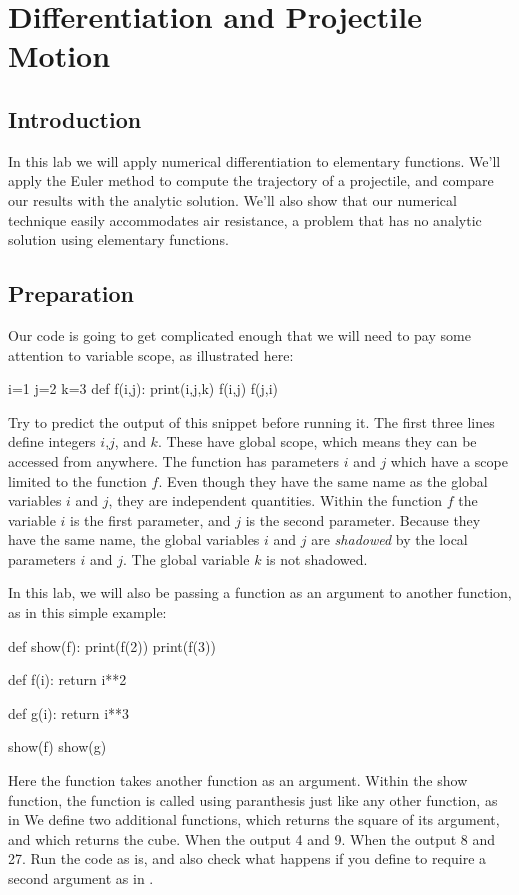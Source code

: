 \chapter{Differentiation and Projectile Motion}

\section{Introduction}

In this lab we will apply numerical differentiation to elementary
functions.  We'll apply the Euler method to compute the trajectory of
a projectile, and compare our results with the analytic solution.
We'll also show that our numerical technique easily accommodates air
resistance, a problem that has no analytic solution using elementary
functions.

\section{Preparation}

Our code is going to get complicated enough that we will need to pay
some attention to variable scope, as illustrated here:
\begin{python}
i=1
j=2
k=3
def f(i,j):
    print(i,j,k)
f(i,j)
f(j,i)
\end{python}
Try to predict the output of this snippet before running it.  The
first three lines define integers $i$,$j$, and $k$. These have global
scope, which means they can be accessed from anywhere.  The function
 has parameters $i$ and $j$ which have a scope limited to
the function $f$.  Even though they have the same name as the global
variables $i$ and $j$, they are independent quantities.  Within the
function $f$ the variable $i$ is the first parameter, and $j$ is the
second parameter.  Because they have the same name, the global
variables $i$ and $j$ are {\em shadowed} by the local parameters $i$
and $j$.  The global variable $k$ is not shadowed.

In this lab, we will also be passing a function as an argument to another
function, as in this simple example:
\begin{python}
def show(f):
    print(f(2))
    print(f(3))    
    
def f(i):
    return i**2

def g(i):
    return i**3

show(f)
show(g)    
\end{python}
Here the  function takes another function  as an
argument.  Within the show function, the function  is called
using paranthesis just like any other function, as in  We
define two additional functions,  which returns the square of
its argument, and  which returns the cube.  When
 the output 4 and 9.  When  the output 8
and 27.  Run the code as is, and also check what happens if you define
 to require a second argument as in .

